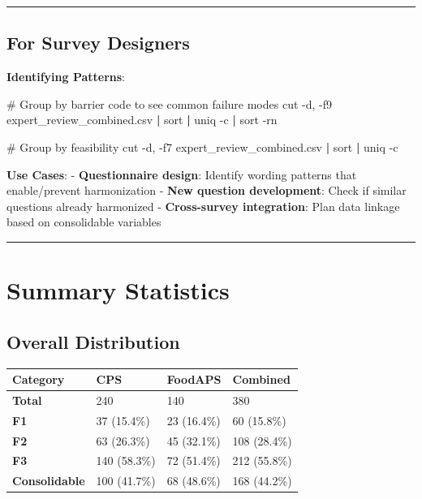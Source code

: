 \documentclass[
  letterpaper,
]{report}
\newenvironment{Shaded}{\begin{snugshade}}{\end{snugshade}}
\newcommand{\AttributeTok}[1]{\textcolor[rgb]{0.40,0.45,0.13}{#1}}
\newcommand{\CommentTok}[1]{\textcolor[rgb]{0.37,0.37,0.37}{#1}}
\newcommand{\FunctionTok}[1]{\textcolor[rgb]{0.28,0.35,0.67}{#1}}
\newcommand{\KeywordTok}[1]{\textcolor[rgb]{0.00,0.23,0.31}{\textbf{#1}}}
\newcommand{\NormalTok}[1]{\textcolor[rgb]{0.00,0.23,0.31}{#1}}
\newcommand{\StringTok}[1]{\textcolor[rgb]{0.13,0.47,0.30}{#1}}
\begin{document}
\begin{center}\rule{0.5\linewidth}{0.5pt}\end{center}

\subsection{For Survey Designers}\label{for-survey-designers}

\textbf{Identifying Patterns}:

\begin{Shaded}
\begin{Highlighting}[]
\CommentTok{\# Group by barrier code to see common failure modes}
\FunctionTok{cut} \AttributeTok{{-}d}\StringTok{\textquotesingle{},\textquotesingle{}} \AttributeTok{{-}f9}\NormalTok{ expert\_review\_combined.csv }\KeywordTok{|} \FunctionTok{sort} \KeywordTok{|} \FunctionTok{uniq} \AttributeTok{{-}c} \KeywordTok{|} \FunctionTok{sort} \AttributeTok{{-}rn}

\CommentTok{\# Group by feasibility}
\FunctionTok{cut} \AttributeTok{{-}d}\StringTok{\textquotesingle{},\textquotesingle{}} \AttributeTok{{-}f7}\NormalTok{ expert\_review\_combined.csv }\KeywordTok{|} \FunctionTok{sort} \KeywordTok{|} \FunctionTok{uniq} \AttributeTok{{-}c}
\end{Highlighting}
\end{Shaded}

\textbf{Use Cases}: - \textbf{Questionnaire design}: Identify wording
patterns that enable/prevent harmonization - \textbf{New question
development}: Check if similar questions already harmonized -
\textbf{Cross-survey integration}: Plan data linkage based on
consolidable variables

\begin{center}\rule{0.5\linewidth}{0.5pt}\end{center}

\section{Summary Statistics}\label{summary-statistics-2}

\subsection{Overall Distribution}\label{overall-distribution}

\begin{longtable}[]{@{}llll@{}}
\toprule\noalign{}
Category & CPS & FoodAPS & Combined \\
\midrule\noalign{}
\endhead
\bottomrule\noalign{}
\endlastfoot
\textbf{Total} & 240 & 140 & 380 \\
\textbf{F1} & 37 (15.4\%) & 23 (16.4\%) & 60 (15.8\%) \\
\textbf{F2} & 63 (26.3\%) & 45 (32.1\%) & 108 (28.4\%) \\
\textbf{F3} & 140 (58.3\%) & 72 (51.4\%) & 212 (55.8\%) \\
\textbf{Consolidable} & 100 (41.7\%) & 68 (48.6\%) & 168 (44.2\%) \\
\end{longtable}
\end{document}
